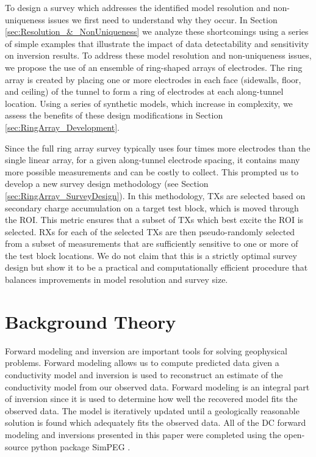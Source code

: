 \documentclass[preprint,authoryear,12pt]{elsarticle}
\begin{document}
To design a survey which addresses the identified model resolution and non-uniqueness issues we first need to understand why they occur. In Section \ref{sec:Resolution_&_NonUniqueness} we analyze these shortcomings using a series of simple examples that illustrate the impact of data detectability and sensitivity on inversion results. To address these model resolution and non-uniqueness issues, we propose the use of an ensemble of ring-shaped arrays of electrodes. The ring array is created by placing one or more electrodes in each face (sidewalls, floor, and ceiling) of the tunnel to form a ring of electrodes at each along-tunnel location. Using a series of synthetic models, which increase in complexity, we assess the benefits of these design modifications in Section \ref{sec:RingArray_Development}.

Since the full ring array survey typically uses four times more electrodes than the single linear array, for a given along-tunnel electrode spacing, it contains many more possible measurements and can be costly to collect. This prompted us to develop a new survey design methodology (see Section \ref{sec:RingArray_SurveyDesign}). In this methodology, TXs are selected based on secondary charge accumulation on a target test block, which is moved through the ROI. This metric ensures that a subset of TXs which best excite the ROI is selected. RXs for each of the selected TXs are then pseudo-randomly selected from a subset of measurements that are sufficiently sensitive to one or more of the test block locations. We do not claim that this is a strictly optimal survey design but show it to be a practical and computationally efficient procedure that balances improvements in model resolution and survey size.


\section{Background Theory}
\label{sec:Background}


Forward modeling and inversion are important tools for solving geophysical problems. Forward modeling allows us to compute predicted data given a conductivity model and inversion is used to reconstruct an estimate of the conductivity model from our observed data. Forward modeling is an integral part of inversion since it is used to determine how well the recovered model fits the observed data. The model is iteratively updated until a geologically reasonable solution is found which adequately fits the observed data. All of the DC forward modeling and inversions presented in this paper were completed using the open-source python package SimPEG \citep{Cockett2015}.
\end{document}
